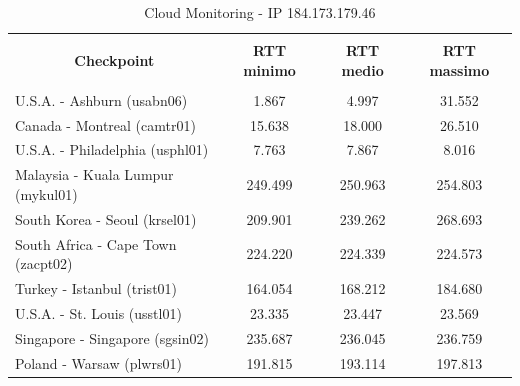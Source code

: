 \documentclass[a4paper,11pt]{book}
\begin{document}
\begin{table}[!ht]
\begin{tabular}{|l|c|c|c|}
\hline
\multicolumn{1}{|c|}{\textbf{}} & {\textbf{}} & {\textbf{}} & {\textbf{}}\\
\multicolumn{1}{|c|}{\textbf{Checkpoint}} & {\textbf{RTT minimo}} & {\textbf{RTT medio}} & {\textbf{RTT massimo}}\\
\multicolumn{1}{|c|}{\textbf{}} & {\textbf{}} & {\textbf{}} & {\textbf{}}\\
\hline
U.S.A. - Ashburn (usabn06) & 1.867 & 4.997 & 31.552\\
Canada - Montreal (camtr01) & 15.638 & 18.000 & 26.510\\
U.S.A. - Philadelphia (usphl01) & 7.763 & 7.867 & 8.016\\
Malaysia - Kuala Lumpur (mykul01) & 249.499 & 250.963 & 254.803\\
South Korea - Seoul (krsel01) & 209.901 & 239.262 & 268.693\\
South Africa - Cape Town (zacpt02) & 224.220 & 224.339 & 224.573\\
Turkey - Istanbul (trist01) & 164.054 & 168.212 & 184.680\\
U.S.A. - St. Louis (usstl01) & 23.335 & 23.447 & 23.569\\
Singapore - Singapore (sgsin02) & 235.687 & 236.045 & 236.759\\
Poland - Warsaw (plwrs01) & 191.815 & 193.114 & 197.813\\
\hline
\end{tabular}
\caption{Cloud Monitoring - IP 184.173.179.46}\label{table:Monitoring_3}
\end{table}

~
\end{document}
